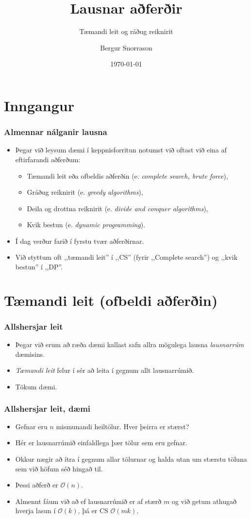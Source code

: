 \documentclass{beamer}
\title{Lausnar aðferðir}
\subtitle{Tæmandi leit og ráðug reiknirit}
\author{Bergur Snorrason}
\date{\today}
\renewcommand\O{\mathcal{O}}
\begin{document}
\frame{\titlepage}

\section{Inngangur}

\begin{frame}
	\frametitle{Almennar nálganir lausna}
\begin{itemize}
	\item<1-> Þegar við leysum dæmi í keppnisforritun notumst við oftast við eina af eftirfarandi aðferðum:
	\begin{itemize}
		\item<2-> Tæmandi leit eða ofbeldis aðferðin (e. \emph{complete search, brute force}),
		\item<3-> Gráðug reiknirit (e. \emph{greedy algorithms}),
		\item<4-> Deila og drottna reiknirit (e. \emph{divide and conquer algorithms}),
		\item<5-> Kvik bestun (e. \emph{dynamic programming}).
	\end{itemize}
	\item<6-> Í dag verður farið í fyrstu tvær aðferðirnar.
	\item<7-> Við styttum oft ,,tæmandi leit'' í ,,CS'' (fyrir ,,Complete search'') og ,,kvik bestun'' í ,,DP''.
\end{itemize}
\end{frame}

\section{Tæmandi leit (ofbeldi aðferðin)}

\begin{frame}
	\frametitle{Allshersjar leit}
\begin{itemize}
	\item<1-> Þegar við erum að ræða dæmi kallast safn allra mögulega lausna \emph{lausnarrúm} dæmisins.
	\item<2-> \emph{Tæmandi leit} felur í sér að leita í gegnum allt lausnarrúmið.
	\item<3-> Tökum dæmi.
\end{itemize}
\end{frame}

\begin{frame}
	\frametitle{Allshersjar leit, dæmi}
\begin{itemize}
	\item<1-> Gefnar eru $n$ mismunandi heiltölur. Hver þeirra er stærst?
	\item<2-> Hér er lausnarrúmið einfaldlega þær tölur sem eru gefnar.
	\item<3-> Okkur nægir að ítra í gegnum allar tölurnar og halda utan um stærstu töluna sem við höfum séð hingað til.
	\item<4-> Þessi aðferð er $\O(n)$.
	\item<5-> Almennt fáum við að ef lausnarrúmið er af stærð $m$ og við getum athugað hverja lasun í $\O(k)$, þá er CS $\O(mk)$.
\end{itemize}
\end{frame}
\end{document}
